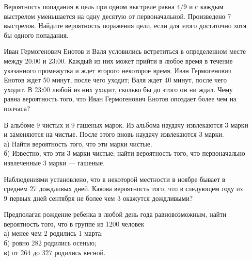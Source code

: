 \newpage\setcounter{zad}{0}



\begin{zkrW}{20}\noindent 
	Вероятность попадания в цель при одном выстреле равна $4/9$ и с каждым выстрелом уменьшается на одну десятую от первоначальной. Произведено 7 выстрелов. Найдите вероятность поражения цели, если для этого достаточно хотя бы одного попадания.
 
\end{zkrW}

\begin{zkrW}{20}\noindent 
	Иван Гермогенович Енотов и Валя условились встретиться в определенном месте между 20:00 и 23:00. Каждый из них может прийти в любое время в течение указанного промежутка и ждет второго некоторое время. Иван Гермогенович Енотов ждет 50 минут, после чего уходит; Валя ждет 40 минут, после чего уходит. В 23:00 любой из них уходит, сколько бы до этого он ни ждал. Чему равна вероятность того, что Иван Гермогенович Енотов опоздает более чем на полчаса?
 
\end{zkrW}

\begin{zkrW}{20}\noindent 
	В альбоме 9 чистых и 9 гашеных марок. Из альбома наудачу извлекаются 3 марки и заменяются на чистые. После этого вновь наудачу извлекаются 3 марки. \\ \indent а) Найти вероятность того, что эти марки чистые. \\ \indent б) Известно, что эти 3 марки чистые; найти вероятность того, что первоначально извлеченные 3 марки --- гашеные.
 
\end{zkrW}

\begin{zkrW}{20}\noindent 
	Наблюдениями установлено, что в некоторой местности в ноябре бывает в среднем 27 дождливых дней. Какова вероятность того, что в следующем году из 9 первых дней сентября не более чем 3 окажутся дождливыми?
 
\end{zkrW}

\begin{zkrW}{20}\noindent 
	Предполагая рождение ребенка в любой день года равновозможным, найти вероятность того, что в группе из 1200 человек \\ \indent а) менее чем 2 родились 1 марта; \\ \indent б) ровно 282 родились осенью; \\ \indent в) от 264 до 327 родились весной.
 
\end{zkrW}

